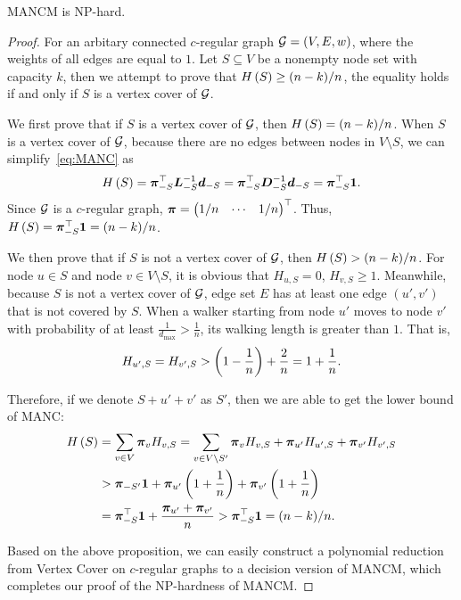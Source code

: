 \documentclass[sigconf]{acmart}
\begin{document}
\begin{theorem}\label{thm:np-hard}
  MANCM is NP-hard.
\end{theorem}
\begin{proof}
  For an arbitary connected \(c\)-regular graph \(\mathcal{G}=(V,E,w)\), where the weights of all edges are equal to \(1\).
  Let \(S\subseteq V\) be a nonempty node set with capacity \(k\), then we attempt to prove that \(H\left(S\right)\ge (n-k)/n\), the equality holds if and only if \(S\) is a vertex cover of \(\mathcal{G}\).

  We first prove that if \(S\) is a vertex cover of \(\mathcal{G}\), then \(H\left(S\right)=(n-k)/n\).
  When \(S\) is a vertex cover of \(\mathcal{G}\), because there are no edges between nodes in \(V\setminus S\), we can simplify~\eqref{eq:MANC} as
  \[H\left(S\right)=\boldsymbol{\pi}_{-S}^\top\boldsymbol{L}_{-S}^{-1}\boldsymbol{d}_{-S}=\boldsymbol{\pi}_{-S}^\top\boldsymbol{D}_{-S}^{-1}\boldsymbol{d}_{-S}=\boldsymbol{\pi}_{-S}^\top\boldsymbol{1}.\]
  Since \(\mathcal{G}\) is a \(c\)-regular graph, \(\boldsymbol{\pi}=\begin{pmatrix}1/n&\cdots&1/n\end{pmatrix}^\top\).
  Thus, \(H\left(S\right)=\boldsymbol{\pi}_{-S}^\top\boldsymbol{1}=(n-k)/n\).

  We then prove that if \(S\) is not a vertex cover of \(\mathcal{G}\), then \(H\left(S\right)>(n-k)/n\).
  For node \(u\in S\) and node \(v\in V\setminus S\), it is obvious that \(H_{u,S}=0\), \(H_{v,S}\ge1\).
  Meanwhile, because \(S\) is not a vertex cover of \(\mathcal{G}\), edge set \(E\) has at least one edge \((u',v')\) that is not covered by \(S\).
  When a walker starting from node \(u'\) moves to node \(v'\) with probability of at least \(\frac{1}{d_{\max}}>\frac{1}{n}\), its walking length is greater than \(1\).
  That is,
  \[H_{u',S}=H_{v',S}>\left( 1-\frac{1}{n} \right)+\frac{2}{n}=1+\frac{1}{n}.\]

  Therefore, if we denote \(S+u'+v'\) as \(S'\), then we are able to get the lower bound of MANC:
  \begin{align*}
    H\left(S\right) & =\sum_{v\in V}\boldsymbol{\pi}_vH_{v,S}=\sum_{v\in V\setminus S'}\boldsymbol{\pi}_vH_{v,S}+\boldsymbol{\pi}_{u'}H_{u',S}+\boldsymbol{\pi}_{v'}H_{v',S} \\
             & >\boldsymbol{\pi}_{-S'}\boldsymbol{1}+\boldsymbol{\pi}_{u'}\left( 1+\frac{1}{n} \right)+\boldsymbol{\pi}_{v'}\left( 1+\frac{1}{n} \right)                         \\
             & =\boldsymbol{\pi}_{-S}^\top\boldsymbol{1}+\frac{\boldsymbol{\pi}_{u'}+\boldsymbol{\pi}_{v'}}n
    >\boldsymbol{\pi}_{-S}^\top\boldsymbol{1}=(n-k)/n.
  \end{align*}

  Based on the above proposition, we can easily construct a polynomial reduction from Vertex Cover on \(c\)-regular graphs to a decision version of MANCM, which completes our proof of the NP-hardness of MANCM.

\end{proof}
\end{document}
